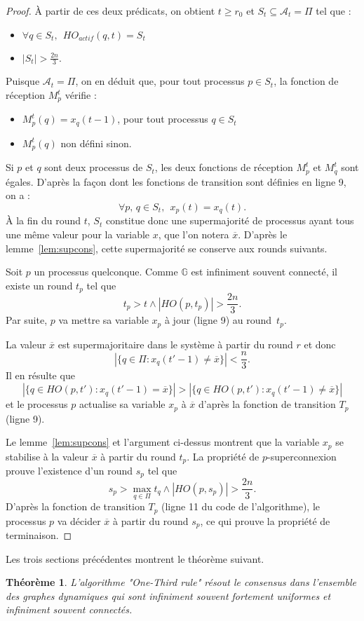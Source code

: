 \documentclass{article}
\newtheorem{theorem}{Théorème}
\begin{document}
\begin{proof}

	À partir de ces deux prédicats, on obtient $t \geq r_0 $ et $S_t \subseteq \mathcal{A}_t = \Pi $ tel que :
	\begin{itemize}

		\item $\forall q \in S_t, \ \ HO_{actif}(q, t ) = S_t $
		\item $|S_t | > \frac{2 n}{3}$.

	\end{itemize}

	Puisque $\mathcal{A}_t = \Pi $, on en déduit que, pour tout processus $p \in S_t$, la fonction de réception $M_p^t$  v\'erifie :
	\begin{itemize}

		\item $M_p^t (q) = x_q( t-1 )$,  pour tout processus $q \in S_t$
		\item $M_p^t (q)  $ non défini sinon.

	\end{itemize}

Si $p$ et $q$ sont deux processus de $S_t$,   les deux fonctions de r\'eception
	$ M_p^t$ et $ M_q^t$ sont \'egales.
D'après la façon dont les fonctions de transition sont d\'efinies en ligne 9, on a :
	 $$ \forall p, \, q \in S_t, \ \ x_p(t) = x_q(t)   .$$
À la fin du round $t$, $S_t$ constitue donc une supermajorité de processus ayant tous une même valeur pour la variable $x$, 
	que l'on notera $\overline{x}$.
D'après le lemme~\ref{lem:supcons}, cette supermajorité se conserve aux rounds suivants.
	
Soit $p$ un processus quelconque.
Comme $\mathds{G}$ est infiniment souvent  connect\'e, il existe un round $t_p$ 
	tel que 
	$$ t_p >t \wedge | HO (p,t_p)  | > \frac{2 n}{3} . $$
Par suite, $p$ va mettre sa variable $x_p$ \`a jour (ligne 9) au round~$t_p$.

La valeur $\overline{x}$ est supermajoritaire dans le syst\`eme \`a partir du round $r$ et donc 
	$$ | \{ q\in \Pi : x_q(t'-1) \neq \overline{x}  \} | < \frac{n}{3} .$$
Il en r\'esulte que 
	$$  | \{ q\in HO(p,t')  : x_q(t'-1) =   \overline{x}  \} | >   | \{ q\in HO(p,t')  : x_q(t'-1) \neq   \overline{x}  \} | $$ 
	et le processus $p$ actualise sa variable $x_p$ \`a $\overline{x} $ d'apr\`es la fonction de transition $T_p$ 
	(ligne 9).

Le lemme~\ref{lem:supcons} et l'argument ci-dessus montrent que la variable $x_p$ se stabilise \`a la valeur
	$\overline{x} $  \`a partir du round $t_p$.
La propri\'et\'e de $p$-superconnexion prouve l'existence d'un round $s_p$ tel que
	$$ s_p > \max_{q\in\Pi} t_q \wedge | HO (p,s_p)  | > \frac{2 n}{3} . $$
D'apr\`es la fonction de transition $T_p$ (ligne 11 du code de l'algorithme), le processus $p$ va d\'ecider
	$\overline{x} $  \`a partir du round $s_p$, ce qui prouve la propri\'et\'e de terminaison.
\end{proof}

Les trois sections précédentes montrent le th\'eor\`eme suivant. 
\begin{theorem}
L'algorithme "One-Third rule" r\'esout  le consensus dans l'ensemble des graphes dynamiques 
	qui sont infiniment souvent  fortement uniformes et infiniment souvent  connect\'es. 
\end{theorem}
\end{document}
